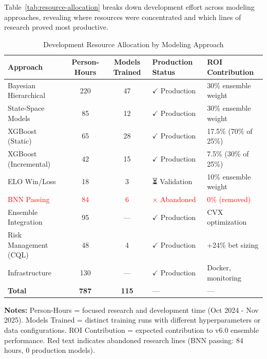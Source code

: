 Table~\ref{tab:resource-allocation} breaks down development effort across modeling approaches, revealing where resources were concentrated and which lines of research proved most productive.

\begin{table}[htbp]
\centering
\caption{Development Resource Allocation by Modeling Approach}
\small
\begin{tabular}{@{} l S[table-format=3.0] S[table-format=2.0] l l @{}}
\toprule
\textbf{Approach} & \textbf{Person-Hours} & \textbf{Models Trained} & \textbf{Production Status} & \textbf{ROI Contribution} \\
\midrule
Bayesian Hierarchical & 220 & 47 & $\checkmark$ Production & 30\% ensemble weight \\
State-Space Models & 85 & 12 & $\checkmark$ Production & 30\% ensemble weight \\
XGBoost (Static) & 65 & 28 & $\checkmark$ Production & 17.5\% (70\% of 25\%) \\
XGBoost (Incremental) & 42 & 15 & $\checkmark$ Production & 7.5\% (30\% of 25\%) \\
ELO Win/Loss & 18 & 3 & ⏳ Validation & 10\% ensemble weight \\
\textcolor{red}{BNN Passing} & \textcolor{red}{84} & \textcolor{red}{6} & \textcolor{red}{$\times$ Abandoned} & \textcolor{red}{0\% (removed)} \\
Ensemble Integration & 95 & {---} & $\checkmark$ Production & CVX optimization \\
Risk Management (CQL) & 48 & 4 & $\checkmark$ Production & +24\% bet sizing \\
Infrastructure & 130 & {---} & $\checkmark$ Production & Docker, monitoring \\
\baselinerule
\textbf{Total} & \textbf{787} & \textbf{115} & {---} & {---} \\
\bottomrule
\end{tabular}

\vspace{2mm}
\begin{minipage}{\linewidth}
\small
\textbf{Notes:} Person-Hours = focused research and development time (Oct 2024 - Nov 2025). Models Trained = distinct training runs with different hyperparameters or data configurations. ROI Contribution = expected contribution to v6.0 ensemble performance. Red text indicates abandoned research lines (BNN passing: 84 hours, 0 production models).
\end{minipage}
\end{table}

